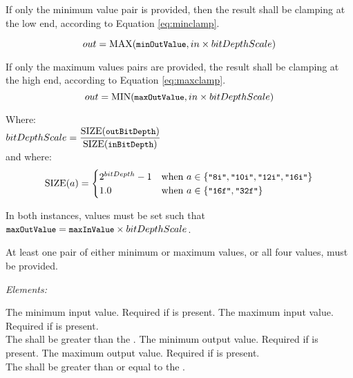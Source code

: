 If only the minimum value pair is provided, then the result shall be clamping at the low end, according to Equation \ref{eq:minclamp}.

    \begin{equation}\label{eq:minclamp}
        out = \mathrm{MAX}( {\small \texttt{minOutValue}}, in \times bitDepthScale)   
    \end{equation}

If only the maximum values pairs are provided, the result shall be clamping at the high end, according to Equation \ref{eq:maxclamp}.
    \begin{equation}\label{eq:maxclamp}
        out = \mathrm{MIN}( {\small \texttt{maxOutValue}}, in \times bitDepthScale)
    \end{equation}              

\tabto{0.25in} Where: \\[10pt]
\tabto{0.5in} $bitDepthScale = \dfrac{\mathrm{SIZE}({\small \texttt{outBitDepth}})}{\mathrm{SIZE}({\small \texttt{inBitDepth}})}$\\[14pt] 
\tabto{0.75in}and where: \\[10pt]
\tabto{1.0in} 
\begin{equation*}
\mathrm{SIZE}(a) =
\begin{cases}
    2^{bitDepth}-1 & \text{when }a \in \{{\small \texttt{"8i"}},{\small \texttt{"10i"}},{\small \texttt{"12i"}},{\small \texttt{"16i"}}\} \\
    1.0 & \text{when }a \in \{{\small \texttt{"16f"}},{\small \texttt{"32f"}}\}
\end{cases}
\end{equation*}

In both instances, values must be set such that ${\small \texttt{maxOutValue}} = {\small \texttt{maxInValue}} \times bitDepthScale$.


At least one pair of either minimum or maximum values, or all four values, must be provided.

\emph{Elements:}
\begin{xmlfields}
    \xmlitem[minInValue][optional] The minimum input value. Required if  is present.
    \xmlitem[maxInValue][optional] The maximum input value. Required if  is present. \\
    The  shall be greater than the .
    \xmlitem[minOutValue][optional] The minimum output value. Required if  is present.
    \xmlitem[maxOutValue][optional] The maximum output value. Required if  is present. \\
    The  shall be greater than or equal to the .
\end{xmlfields}


